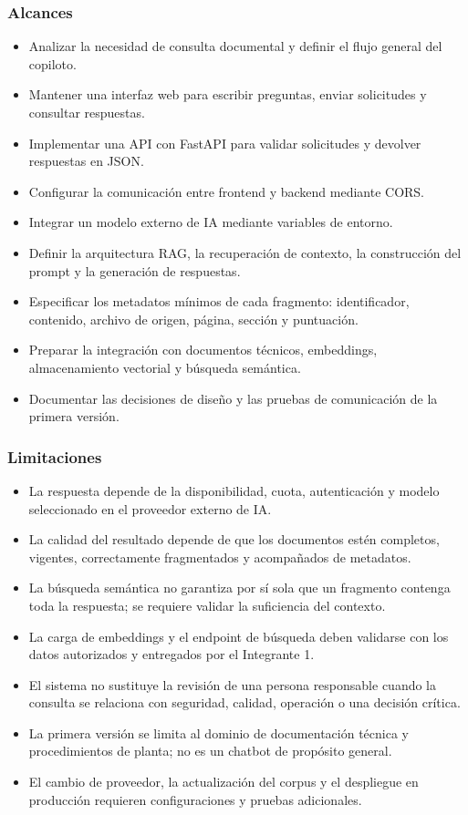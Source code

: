 \subsubsection{Alcances} \label{subsec:alcances}
\begin{itemize}
    \item Analizar la necesidad de consulta documental y definir el flujo general del copiloto.
    \item Mantener una interfaz web para escribir preguntas, enviar solicitudes y consultar respuestas.
    \item Implementar una API con FastAPI para validar solicitudes y devolver respuestas en JSON.
    \item Configurar la comunicación entre frontend y backend mediante CORS.
    \item Integrar un modelo externo de IA mediante variables de entorno.
    \item Definir la arquitectura RAG, la recuperación de contexto, la construcción del prompt y la generación de respuestas.
    \item Especificar los metadatos mínimos de cada fragmento: identificador, contenido, archivo de origen, página, sección y puntuación.
    \item Preparar la integración con documentos técnicos, embeddings, almacenamiento vectorial y búsqueda semántica.
    \item Documentar las decisiones de diseño y las pruebas de comunicación de la primera versión.
\end{itemize}

\subsubsection{Limitaciones} \label{subsec:limitaciones}
\begin{itemize}
    \item La respuesta depende de la disponibilidad, cuota, autenticación y modelo seleccionado en el proveedor externo de IA.
    \item La calidad del resultado depende de que los documentos estén completos, vigentes, correctamente fragmentados y acompañados de metadatos.
    \item La búsqueda semántica no garantiza por sí sola que un fragmento contenga toda la respuesta; se requiere validar la suficiencia del contexto.
    \item La carga de embeddings y el endpoint de búsqueda deben validarse con los datos autorizados y entregados por el Integrante 1.
    \item El sistema no sustituye la revisión de una persona responsable cuando la consulta se relaciona con seguridad, calidad, operación o una decisión crítica.
    \item La primera versión se limita al dominio de documentación técnica y procedimientos de planta; no es un chatbot de propósito general.
    \item El cambio de proveedor, la actualización del corpus y el despliegue en producción requieren configuraciones y pruebas adicionales.
\end{itemize}
